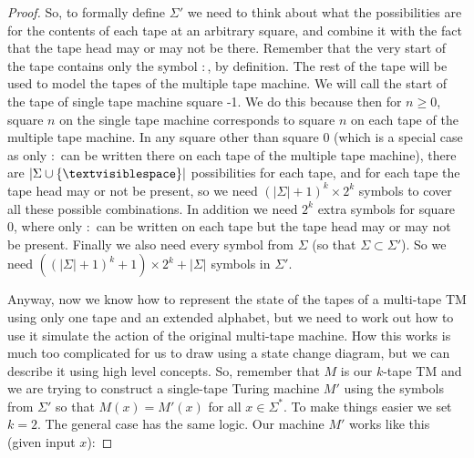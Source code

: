 \documentclass{article}
\theoremstyle{plain}
\theoremstyle{definition}
\newcommand{\tvs}{\textvisiblespace}
\begin{document}
\begin{proof}
So, to formally define $\Sigma'$ we need to think about what the possibilities are for the contents of each tape at an arbitrary square, and combine it with the fact that the tape head may or may not be there.  Remember that the very start of the tape contains only the symbol $:$, by definition. The rest of the tape will be used to model the tapes of the multiple tape machine. We will call the start of the tape of single tape machine square -1. We do this because then for $n\geq 0$, square $n$ on the single tape machine corresponds to square $n$ on each tape of the multiple tape machine. In any square other than square 0 (which is a special case as only $:$ can be written there on each tape of the multiple tape machine), there are $|\Sigma\cup\{\tvs\}|$ possibilities for each tape, and for each tape the tape head may or not be present, so we need $(|\Sigma|+1)^k\times 2^k$ symbols to cover all these possible combinations. In addition we need $2^k$ extra symbols for square 0, where only $:$ can be written on each tape but the tape head may or may not be present. Finally we also need every symbol from $\Sigma$ (so that $\Sigma\subset \Sigma'$). So we need $((|\Sigma|+1)^k+1)\times 2^k+|\Sigma|$ symbols in $\Sigma'$.

Anyway, now we know how to represent the state of the tapes of a multi-tape TM using only one tape and an extended alphabet, but we need to work out how to use it simulate the action of the original multi-tape machine. How this works is much too complicated for us to draw using a state change diagram, but we can describe it using high level concepts. So, remember that $M$ is our $k$-tape TM and we are trying to construct a single-tape Turing machine $M'$ using the symbols from $\Sigma'$ so that $M(x)=M'(x)$ for all $x\in \Sigma^*$. To make things easier we set $k=2$. The general case has the same logic. Our machine $M'$ works like this (given input $x$):


\end{proof}
\end{document}
